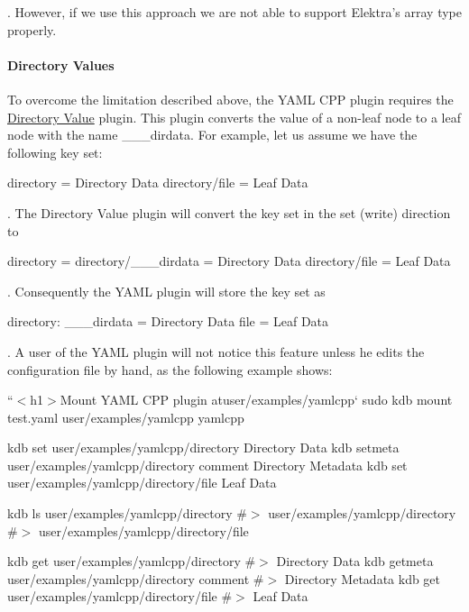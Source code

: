 . However, if we use this approach we are not able to support Elektra’s array type properly.

\paragraph*{Directory Values}

To overcome the limitation described above, the Y\+A\+ML C\+PP plugin requires the \hyperlink{md_src_plugins_directoryvalue_README_src_plugins_directoryvalue_README_md}{Directory Value} plugin. This plugin converts the value of a non-\/leaf node to a leaf node with the name {\ttfamily \+\_\+\+\_\+\+\_\+dirdata}. For example, let us assume we have the following key set\+:


\begin{DoxyCode}
directory      = Directory Data
directory/file = Leaf Data
\end{DoxyCode}


. The Directory Value plugin will convert the key set in the set (write) direction to


\begin{DoxyCode}
directory            =
directory/\_\_\_dirdata = Directory Data
directory/file       = Leaf Data
\end{DoxyCode}


. Consequently the Y\+A\+ML plugin will store the key set as


\begin{DoxyCode}
directory:
  \_\_\_dirdata = Directory Data
  file       = Leaf Data
\end{DoxyCode}


. A user of the Y\+A\+ML plugin will not notice this feature unless he edits the configuration file by hand, as the following example shows\+:

``{\ttfamily  $<$h1$>$Mount Y\+A\+ML C\+PP plugin at}user/examples/yamlcpp` sudo kdb mount test.\+yaml user/examples/yamlcpp yamlcpp

kdb set user/examples/yamlcpp/directory \textquotesingle{}Directory Data\textquotesingle{} kdb setmeta user/examples/yamlcpp/directory comment \textquotesingle{}Directory Metadata\textquotesingle{} kdb set user/examples/yamlcpp/directory/file \textquotesingle{}Leaf Data\textquotesingle{}

kdb ls user/examples/yamlcpp/directory \#$>$ user/examples/yamlcpp/directory \#$>$ user/examples/yamlcpp/directory/file

kdb get user/examples/yamlcpp/directory \#$>$ Directory Data kdb getmeta user/examples/yamlcpp/directory comment \#$>$ Directory Metadata kdb get user/examples/yamlcpp/directory/file \#$>$ Leaf Data

